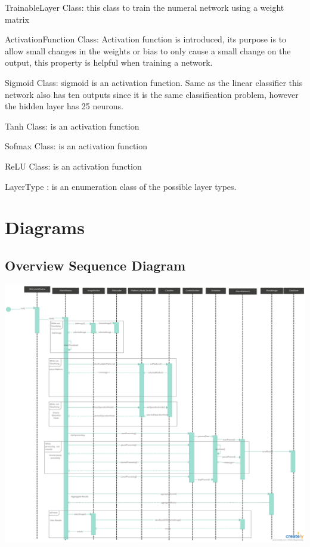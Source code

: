 \documentclass[parskip=full]{scrartcl}
\begin{document}
TrainableLayer Class: this class to train the numeral network using a weight matrix

ActivationFunction Class:  Activation function is introduced, its purpose is to allow small changes in the weights or bias to only cause a small change on the output, this property is helpful when training a network.

Sigmoid Class: sigmoid is an activation function.  Same as the linear classifier this network also has ten outputs since it is the same classification problem, however the hidden layer has 25 neurons.

Tanh Class: is an activation function

Sofmax Class: is an activation function

ReLU Class:  is an activation function





LayerType : is an enumeration class of the possible layer types.



\pagebreak

\section {Diagrams}

\subsection {Overview Sequence Diagram}

\begin{center}
\includegraphics[width=1.0\textwidth]{seq.png}
\end{center}
\end{document}
